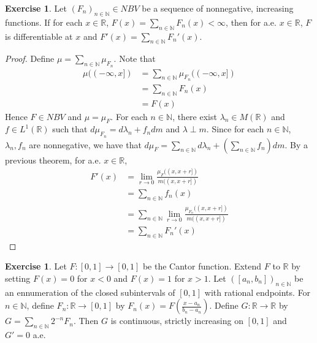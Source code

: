 \documentclass[12pt]{amsart}
\theoremstyle{definition}
\newtheorem{ex}[definition]{Exercise}
\newcommand{\lam}{\lambda}
\newcommand{\N}{\mathbb{N}}
\newcommand{\R}{\mathbb{R}}
\begin{document}
	\begin{ex}
		Let $(F_n)_{n\in \N} \in NBV$ be a sequence of nonnegative, increasing functions. If for each $x \in \R$, $F(x)=\sum_{n \in \N}F_n(x)< \infty$, then for a.e. $x \in \R$, $F$ is differentiable at $x$ and $F'(x) = \sum_{n\in \N}F_n'(x)$. 
	\end{ex}
	
	\begin{proof}
		
		Define $\mu = \sum_{n \in \N}\mu_{F_n}$. Note that 
		\begin{align*}
			\mu((-\infty,x]) 
			&= \sum_{n \in \N}\mu_{F_n}((-\infty,x]) \\
			&= \sum_{n \in \N}F_n(x)\\
			&= F(x)
		\end{align*}
		Hence $F \in NBV$ and $\mu=\mu_F$. For each $n \in \N$, there exist $\lam_n \in M(\R)$ and $f \in L^1(\R)$ such that $d\mu_{F_n} = d\lam_n + f_ndm$ and $\lam \perp m$. Since for each $n \in \N$, $\lam_n, f_n$ are nonnegative, we have that $d\mu_F =  \sum_{n \in \N} d\lam_n + (\sum_{n \in \N}f_n)dm$. By a previous theorem, for a.e. $x \in \R$, 
		\begin{align*}
			F'(x) 
			&= \lim_{r \rightarrow 0}\frac{\mu_F((x,x+r])}{m((x,x+r])} \\
			&= \sum_{n \in \N}f_n(x)\\
			&= \sum_{n \in \N}\lim_{r \rightarrow 0}\frac{\mu_{F_n}((x,x+r])}{m((x,x+r])} \\
			&= \sum_{n \in \N}F_n'(x)
		\end{align*}
	\end{proof}
	
	\begin{ex}
		Let $F:[0,1]\rightarrow [0, 1]$ be the Cantor function. Extend $F$ to $\R$ by setting $F(x) = 0$ for $x<0$ and $F(x)=1$ for $x>1$. Let $([a_n,b_n])_{n \in \N}$ be an ennumeration of the closed subintervals of $[0,1]$ with rational endpoints. For $n \in \N$, define $F_n:\R \rightarrow [0,1]$ by $F_n(x) = F(\frac{x-a_n}{b_n-a_n})$. Define $G:\R \rightarrow \R$ by $G = \sum_{n \in \N}2^{-n}F_n$. Then $G$ is continuous, strictly increasing on $[0,1]$ and $G'=0$ a.e.
	\end{ex}
	
\end{document}
